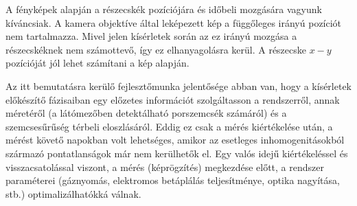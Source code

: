	A fényképek alapján a részecskék pozíciójára és időbeli mozgására vagyunk kíváncsiak.
	A kamera objektíve által leképezett kép a függőleges irányú pozíciót nem tartalmazza. Mivel jelen
	kísérletek során az ez irányú mozgása a részecskéknek nem számottevő, így ez elhanyagolásra kerül.
	A részecske $x-y$ pozícióját jól lehet számítani a kép alapján. 
	
	Az itt bemutatásra kerülő fejlesztőmunka jelentősége abban
        van, hogy a kísérletek előkészítő fázisaiban egy előzetes
        információt szolgáltasson a rendszerről, annak méretéről (a
        látómezőben detektálható porszemcsék számáról) és a
        szemcsesűrűség térbeli eloszlásáról. Eddig ez csak a mérés
        kiértékelése után, a mérést követő napokban volt lehetséges,
        amikor az esetleges inhomogenitásokból származó pontatlanságok
        már nem kerülhetők el. Egy valós idejű kiértékeléssel és visszacsatolással viszont,
        a mérés (képrögzítés) megkezdése előtt, a rendszer paraméterei
        (gáznyomás, elektromos betáplálás teljesítménye, optika
        nagyítása, stb.) optimalizálhatókká válnak.
	
